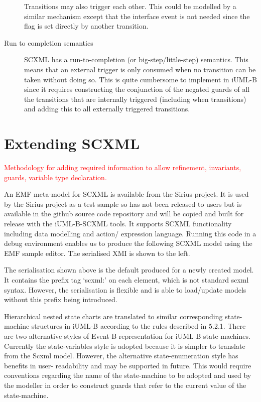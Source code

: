 \documentclass{easychair}
\begin{document}
\begin{description}
Transitions may also trigger each other. This could be 
modelled by a similar mechanism except that the interface 
event is not needed since the flag is set directly by 
another transition.

\item [Run to completion semantics] SCXML has a run-to-completion (or big-step/little-step) semantics. This means that an external trigger is only consumed when no transition can be taken without doing so. This is quite cumbersome to implement in iUML-B since it requires constructing the conjunction of the negated guards of all the transitions that are internally triggered (including when transitions) and adding this to all externally triggered transitions.

\end{description}


\section{Extending SCXML}
\label{sect:extension}

\textcolor{red}{Methodology for adding required information to allow refinement, invariants,
guards, variable type declaration.}

An EMF meta-model for SCXML is available from the Sirius 
project. It is used by the Sirius project as a test sample 
so has not been released to users but is available in the 
github source code repository and will be copied and built 
for release with the iUML-B-SCXML tools. It supports SCXML 
functionality including data modelling and action/
expression language. 
Running this code in a debug environment enables us to 
produce the following SCXML model using the EMF sample 
editor. The serialised XMI is shown to the left. 

The serialisation shown above is the default produced for a 
newly created model. It contains the prefix tag ‘scxml:’ on 
each element, which is not standard scxml syntax. However, 
the serialisation is flexible and is able to load/update 
models without this prefix being introduced.

Hierarchical nested state charts are translated to similar 
corresponding state-machine structures in iUML-B according 
to the rules described in 5.2.1. There are two alternative 
styles of Event-B representation for iUML-B state-machines. 
Currently the state-variables style is adopted because it 
is simpler to translate from the Scxml model. However, the 
alternative state-enumeration style has benefits in user-
readability and may be supported in future. This would 
require conventions regarding the name of the state-machine 
to be adopted and used by the modeller in order to 
construct guards that refer to the current value of the 
state-machine.
\end{document}
